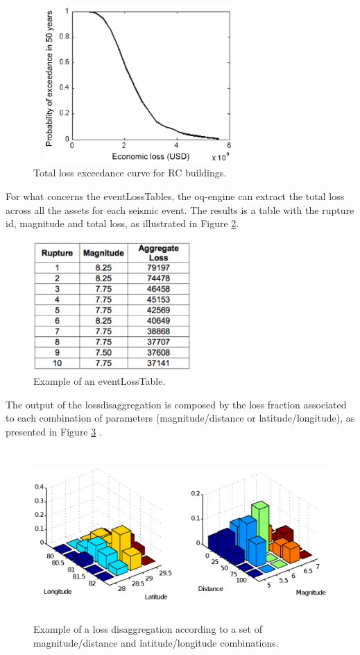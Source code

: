 \begin{figure}[H!]
\centering
\includegraphics[width=8cm,height=6cm]{./figures/risk/LossCurveIstanbul.eps}
\caption{Total loss exceedance curve for RC buildings.}
\label{fig:ProbLosses}
\end{figure} 

For what concerns the \glspl{eventLossTable}, the oq-engine can extract the total loss across all the assets for each seismic event. The results is a table with the rupture id, magnitude and total loss, as illustrated in Figure \ref{fig:eventLossTable}.

\begin{figure}[H!]
\centering
\includegraphics[width=6cm,height=5cm]{./figures/risk/EventLossTable.eps}
\caption{Example of an \gls{eventLossTable}.}
\label{fig:eventLossTable}
\end{figure} 

The output of the \gls{lossdisaggregation} is composed by the loss fraction associated to each combination of parameters (magnitude/distance or latitude/longitude), as presented in Figure \ref{fig:disaggregation} .

\begin{figure}[H!]
\centering
\includegraphics[width=14cm,height=6.5cm]{./figures/risk/Disaggregation.eps}
\caption{Example of a loss disaggregation according to a set of magnitude/distance and latitude/longitude combinations.}
\label{fig:disaggregation}
\end{figure} 
